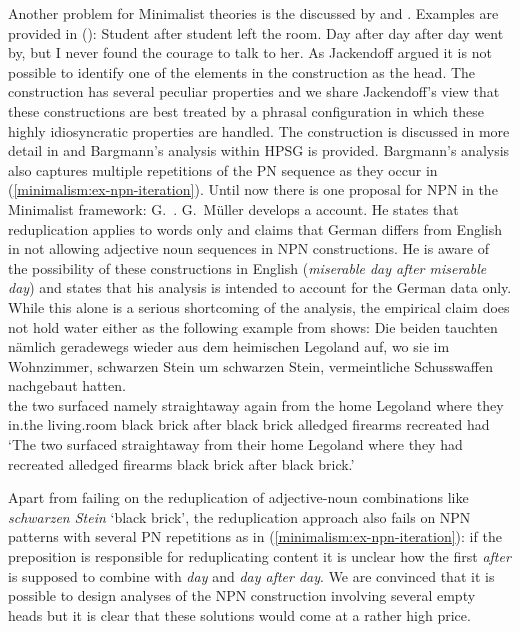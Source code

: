 \documentclass[output=paper]{langsci/langscibook}
\begin{document}
Another problem for Minimalist theories is the  discussed by \citet{Matsuyama2004a} and \citet{Jackendoff2008a}. Examples are provided in ():
\eal
\ex Student after student left the room.
\ex
\label{minimalism:ex-npn-iteration}
Day after day after day went by, but I never found the courage to talk to
her. \citep{Bargmann2015a}
\zl
As Jackendoff argued it is not possible to identify one of the elements in the construction as the
head. The construction has several peculiar properties and we share Jackendoff's view that these
constructions are best treated by a phrasal configuration in which these highly idiosyncratic
properties are handled. The construction is discussed in more detail in  and
Bargmann's analysis within HPSG is provided. Bargmann's analysis also captures multiple repetitions
of the PN sequence as they occur in (\ref{minimalism:ex-npn-iteration}). Until now there is one proposal for NPN in the Minimalist framework:
G.\ \citet{GMueller2011a}. G.\ Müller develops a  account. He states that reduplication
applies to words only and claims that German differs from English in not allowing adjective noun
sequences in NPN constructions. He is aware of the possibility of these constructions in English
(\emph{miserable day after miserable day}) and states that his analysis is intended to account for
the German data only. While this alone is a serious shortcoming of the analysis, the empirical claim
does not hold water either as the following example from  shows:
\ea
\gll Die beiden tauchten nämlich geradewegs wieder aus dem heimischen Legoland auf, wo sie im
Wohnzimmer, schwarzen Stein um schwarzen Stein, vermeintliche Schusswaffen nachgebaut
hatten.\footnotemark\\
     the two    surfaced namely straightaway again   from the home Legoland \particle{} where they
     in.the living.room black brick after black brick alledged firearms recreated had\\%
{}
\glt `The two surfaced straightaway from their home Legoland where they had recreated alledged
firearms black brick after black brick.'
\z
\begin{sloppypar}
Apart from failing on the reduplication of adjective-noun combinations like \emph{schwar\-zen Stein}
`black brick', the reduplication approach also fails on NPN patterns with several PN repetitions as
in (\ref{minimalism:ex-npn-iteration}): if the preposition is responsible for reduplicating content it is
unclear how the first \emph{after} is supposed to combine with \emph{day} and \emph{day after
  day}. We are convinced that it is possible to design analyses of the NPN construction involving
several empty heads but it is clear that these solutions would come at a rather high price.
\end{sloppypar}
\end{document}
